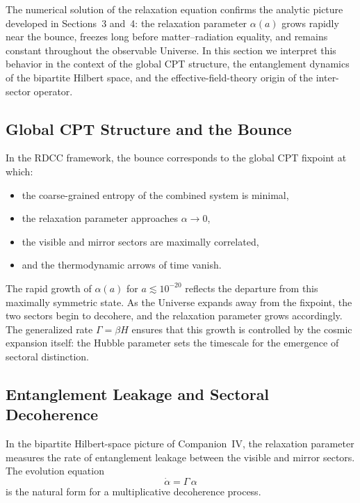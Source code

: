 \documentclass[11pt,a4paper]{article}
\begin{document}
The numerical solution of the relaxation equation confirms the analytic picture developed in
Sections~3 and~4: the relaxation parameter $\alpha(a)$ grows rapidly near the bounce, freezes
long before matter–radiation equality, and remains constant throughout the observable Universe.
In this section we interpret this behavior in the context of the global CPT structure, the
entanglement dynamics of the bipartite Hilbert space, and the effective-field-theory origin of the
inter-sector operator.

\subsection{Global CPT Structure and the Bounce}

In the RDCC framework, the bounce corresponds to the global CPT fixpoint at which:
\begin{itemize}
    \item the coarse-grained entropy of the combined system is minimal,
    \item the relaxation parameter approaches $\alpha \rightarrow 0$,
    \item the visible and mirror sectors are maximally correlated,
    \item and the thermodynamic arrows of time vanish.
\end{itemize}

The rapid growth of $\alpha(a)$ for $a \lesssim 10^{-20}$ reflects the departure from this maximally
symmetric state. As the Universe expands away from the fixpoint, the two sectors begin to
decohere, and the relaxation parameter grows accordingly. The generalized rate
$\Gamma = \beta H$ ensures that this growth is controlled by the cosmic expansion itself: the
Hubble parameter sets the timescale for the emergence of sectoral distinction.

\subsection{Entanglement Leakage and Sectoral Decoherence}

In the bipartite Hilbert-space picture of Companion~IV, the relaxation parameter measures the
rate of entanglement leakage between the visible and mirror sectors. The evolution equation
\begin{equation}
    \dot{\alpha} = \Gamma\,\alpha
\end{equation}
is the natural form for a multiplicative decoherence process.
\end{document}
